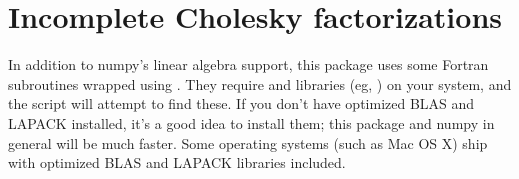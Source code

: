 \section{Incomplete Cholesky factorizations}\label{sec:ichol} %

In addition to numpy's linear algebra support, this package uses some Fortran subroutines wrapped using . They require  and  libraries (eg, ) on your system, and the  script will attempt to find these. If you don't have optimized BLAS and LAPACK installed, it's a good idea to install them; this package and numpy in general will be much faster. Some operating systems (such as Mac OS X) ship with optimized BLAS and LAPACK libraries included.

